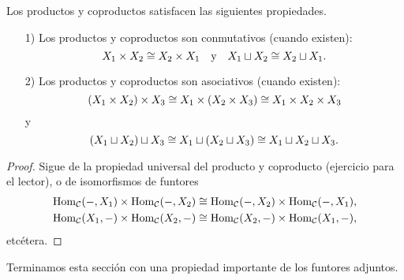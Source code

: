 \documentclass{article}
\numberwithin{equation}{section}
\theoremstyle{definition}
\begin{document}
\begin{observacion}
  Los productos y coproductos satisfacen las siguientes propiedades.

  \begin{enumerate}
  \item[1)] Los productos y coproductos son conmutativos (cuando existen):
    $$X_1\times X_2\cong X_2\times X_1 \quad\text{y}\quad X_1\sqcup X_2\cong X_2\sqcup X_1.$$

  \item[2)] Los productos y coproductos son asociativos (cuando existen):
  $$(X_1\times X_2)\times X_3\cong X_1\times (X_2\times X_3) \cong X_1\times X_2\times X_3$$
  y
  $$(X_1\sqcup X_2)\sqcup X_3\cong X_1\sqcup (X_2\sqcup X_3) \cong X_1\sqcup X_2\sqcup X_3.$$
\end{enumerate}

\begin{proof}
  Sigue de la propiedad universal del producto y coproducto (ejercicio para el lector), o de isomorfismos de funtores
  \begin{gather*}
    \operatorname{Hom}_\mathcal{C} (-,X_1)\times \operatorname{Hom}_\mathcal{C} (-,X_2) \cong \operatorname{Hom}_\mathcal{C} (-,X_2)\times \operatorname{Hom}_\mathcal{C} (-,X_1),\\
    \operatorname{Hom}_\mathcal{C} (X_1,-)\times \operatorname{Hom}_\mathcal{C} (X_2,-) \cong \operatorname{Hom}_\mathcal{C} (X_2,-)\times \operatorname{Hom}_\mathcal{C} (X_1,-),
  \end{gather*}
  etcétera.
\end{proof}
\end{observacion}

Terminamos esta sección con una propiedad importante de los funtores adjuntos.
\end{document}

